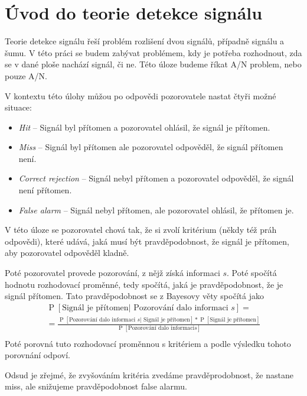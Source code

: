 \section{Úvod do teorie detekce signálu}

Teorie detekce signálu řeší problém rozlišení dvou signálů, případně signálu a
šumu. V této práci se budem zabývat problémem, kdy je potřeba rozhodnout, zda
se v dané ploše nachází signál, či ne. Této úloze budeme říkat A/N problem,
nebo pouze A/N.

V kontextu této úlohy můžou po odpovědi pozorovatele nastat čtyři možné situace:

\begin{itemize}
\item {\it Hit} -- Signál byl přítomen a pozorovatel ohlásil, že signál je
přítomen.
\item {\it Miss} -- Signál byl přítomen ale pozorovatel odpověděl, že signál
přítomen není.
\item {\it Correct rejection} -- Signál nebyl přítomen a pozorovatel odpověděl,
že signál není přítomen.
\item {\it False alarm} -- Signál nebyl přítomen, ale pozorovatel ohlásil, že
přítomen je.
\end{itemize} 

 V této úloze se pozorovatel chová tak,
že si zvolí kritérium (někdy též práh odpovědi), které udává, jaká musí být
pravděpodobnost, že signál je přítomen, aby pozorovatel odpověděl kladně.

\def\P#1{\operatorname{P}\left[#1\right]}
\def\E#1{\mathbb{E}\left[#1\right]}
\def\tP#1{\P{\text{#1}}}

Poté pozorovatel provede pozorování, z nějž získá informaci $s$. Poté spočítá
hodnotu rozhodovací proměnné, tedy spočítá, jaká je pravděpodobnost, že je
signál přítomen. Tato pravděpodobnost se z Bayesovy věty spočítá jako 
\begin{multline*}
\tP{Signál je přítomen| Pozorování dalo informaci $s$} = \\ 
=\frac{\tP{Pozorování dalo informaci $s$
| Signál je přítomen}*\tP{Signál je přítomen}}{\tP{Pozorování dalo informaci
$s$}}\\ \end{multline*}
Poté porovná tuto rozhodovací proměnnou s kritériem a podle výsledku tohoto
porovnání odpoví.

Odsud je zřejmé, že zvyšováním kritéria zvedáme pravděprodobnost, že nastane
miss, ale snižujeme pravděpodobnost false alarmu.

